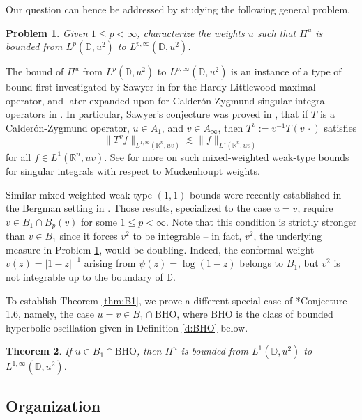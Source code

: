 \documentclass{amsart}
\newtheorem{theorem}{Theorem}[section]
\newtheorem{problem}[theorem]{Problem}
\theoremstyle{definition}
\numberwithin{equation}{section}
\begin{document}
\noindent Our question can hence be addressed by studying the following general problem.
\begin{problem}\label{prob:MWWT}
Given $1 \leq p < \infty$, characterize the weights $u$ such that 
$\Pi^u$ is bounded from $L^p(\mathbb{D},u^2)$ to $L^{p,\infty}(\mathbb{D},u^2)$. 
\end{problem}

The bound of $\Pi^u$ from $L^p(\mathbb{D},u^2)$ to $L^{p,\infty}(\mathbb{D},u^2)$ is an instance of a type of bound first investigated by Sawyer in \cite{Saw85} for the Hardy-Littlewood maximal operator, and later expanded upon for Calder\'on-Zygmund singular integral operators in \cites{CUMP05, LOP19}. In particular, Sawyer's conjecture was proved in \cite{LOP19}, that if $T$ is a Calder\'on-Zygmund operator, $u \in A_1$, and $v \in A_{\infty}$, then $T^v := v^{-1}T(v\,\cdot)$ satisfies 
$$
    \|T^vf\|_{L^{1,\infty}(\mathbb{R}^n,uv)} \lesssim \|f\|_{L^1(\mathbb{R}^n,uv)}
$$
for all $f \in L^1(\mathbb{R}^n,uv)$. See \cites{CRR2020, OP2016, OPR2016, LOBP2019} for more on such mixed-weighted weak-type bounds for singular integrals with respect to Muckenhoupt weights. 

Similar mixed-weighted weak-type $(1,1)$ bounds were recently established in the Bergman setting in \cite{CNSW25}. Those results, specialized to the case $u=v$, require $v \in B_1 \cap B_p(v)$ for some $1 \le p < \infty$. Note that this condition is strictly stronger than $v \in B_1$ since it forces $v^2$ to be integrable -- in fact, $v^2$, the underlying measure in Problem \ref{prob:MWWT}, would be doubling. Indeed, the conformal weight $v(z)=|1-z|^{-1}$ arising from $\psi(z)=\log(1-z)$ belongs to $B_1$, but $v^2$ is not integrable up to the boundary of $\mathbb D$. 

To establish Theorem \ref{thm:B1}, we prove a different special case of \cite{CNSW25}*{Conjecture 1.6}, namely, the case $u=v \in B_1 \cap \text{BHO}$, where BHO is the class of bounded hyperbolic oscillation given in Definition \ref{d:BHO} below. 
\begin{theorem}\label{thm:sawyer}
    If $u \in B_1 \cap \text{BHO}$, then $\Pi^u$ is bounded from $L^1(\mathbb{D},u^2)$ to $L^{1,\infty}(\mathbb{D},u^2)$. 
\end{theorem}

\subsection{Organization}
\end{document}
